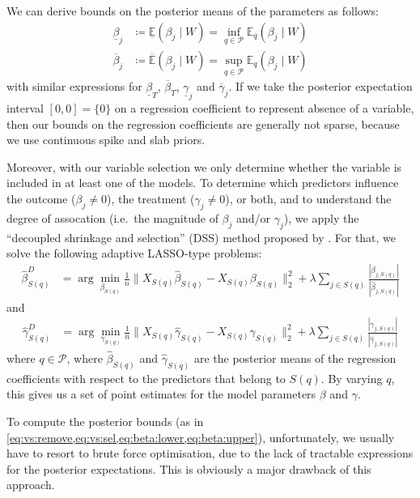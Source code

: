 \documentclass[preprint,12pt]{elsarticle}
\newcommand{\lexp}{\underline{\mathbb{E}}}
\newcommand{\uexp}{\overline{\mathbb{E}}}
\begin{document}
We can derive bounds on the posterior means of the parameters as follows:
\begin{align}
\label{eq:beta:lower}
\underline{\beta}_j&\coloneqq\lexp (\beta_j\mid W)= \inf_{q\in \mathcal{P}} \mathbb{E}_q(\beta_j\mid W) \\
\label{eq:beta:upper}
\overline{\beta}_j&\coloneqq\uexp (\beta_j\mid W)=\sup_{q\in \mathcal{P}} \mathbb{E}_q(\beta_j\mid W)
\end{align}
with similar expressions for 
$\underline{\beta}_T$, $\overline{\beta}_T$,
$\underline{\gamma}_j$ and $\overline{\gamma}_j$.
If we take the posterior expectation interval $[0,0]=\{0\}$ on a regression coefficient to represent absence of a variable, then our bounds on the regression coefficients are generally not sparse, because we use continuous 
spike and slab priors.

Moreover, with our variable selection we only determine whether the variable 
is included in at least one of the models.
To determine which predictors
influence the outcome ($\beta_j\neq 0$),
the treatment ($\gamma_j\neq 0$), or both,
and to understand the degree of assocation
(i.e.\ the magnitude of $\beta_j$ and/or $\gamma_j$),
we apply the 
``decoupled shrinkage and selection'' (DSS) method proposed by \citep{hahn2015}. 
For that, we solve the following adaptive LASSO-type \citep{Zou2006}
problems:
\begin{align}
	\hat{\beta}^D_{S(q)} &= 
	\arg\min_{\beta_{S(q)}} \frac{1}{n}\|X_{S(q)}\hat{\beta}_{S(q)}
	- X_{S(q)} \beta_{S(q)}\|_2^2 + \lambda\sum_{j\in S(q)} 
	\frac{|\beta_{j,S(q)}|}{|\hat{\beta}_{j,S(q)}|}
\end{align}
and
\begin{align}
	\hat{\gamma}^D_{S(q)} &= 
	\arg\min_{\gamma_{S(q)}} \frac{1}{n}\|X_{S(q)}\hat{\gamma}_{S(q)}
	- X_{S(q)} \gamma_{S(q)}\|_2^2 + \lambda\sum_{j\in S(q)} 
	\frac{|\gamma_{j,S(q)}|}{|\hat{\gamma}_{j,S(q)}|}
\end{align}
where $q\in \mathcal{P}$,
where $\hat{\beta}_{S(q)}$ 
and $\hat{\gamma}_{S(q)}$ are the posterior means 
of the regression coefficients with respect to
the predictors that belong to $S(q)$.
By varying $q$, this gives us a set of point estimates for the model parameters $\beta$ and $\gamma$.

To compute the posterior bounds (as in \cref{eq:vs:remove,eq:vs:sel,eq:beta:lower,eq:beta:upper}), unfortunately, we usually have to resort to brute force optimisation, due to the lack of tractable expressions for the posterior expectations. 
This is obviously a major drawback of this approach.
\end{document}
